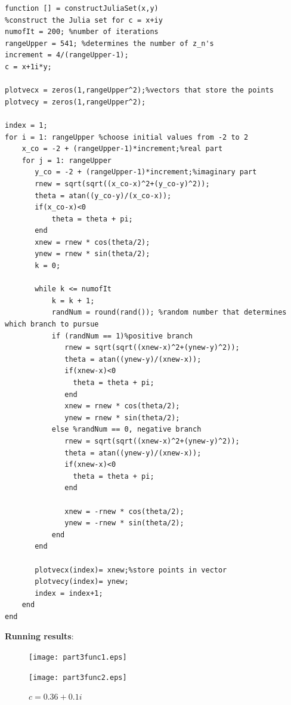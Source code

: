 \documentclass{article}
\begin{document}
\begin{lstlisting}
function [] = constructJuliaSet(x,y)
%construct the Julia set for c = x+iy
numofIt = 200; %number of iterations
rangeUpper = 541; %determines the number of z_n's
increment = 4/(rangeUpper-1);
c = x+1i*y;

plotvecx = zeros(1,rangeUpper^2);%vectors that store the points
plotvecy = zeros(1,rangeUpper^2);

index = 1;
for i = 1: rangeUpper %choose initial values from -2 to 2
    x_co = -2 + (rangeUpper-1)*increment;%real part
    for j = 1: rangeUpper 
       y_co = -2 + (rangeUpper-1)*increment;%imaginary part 
       rnew = sqrt(sqrt((x_co-x)^2+(y_co-y)^2));
       theta = atan((y_co-y)/(x_co-x));
       if(x_co-x)<0
           theta = theta + pi;
       end
       xnew = rnew * cos(theta/2);
       ynew = rnew * sin(theta/2);
       k = 0;

       while k <= numofIt
           k = k + 1;
           randNum = round(rand()); %random number that determines which branch to pursue
           if (randNum == 1)%positive branch
              rnew = sqrt(sqrt((xnew-x)^2+(ynew-y)^2));
              theta = atan((ynew-y)/(xnew-x));
              if(xnew-x)<0
                theta = theta + pi;
              end
              xnew = rnew * cos(theta/2);
              ynew = rnew * sin(theta/2);
           else %randNum == 0, negative branch
              rnew = sqrt(sqrt((xnew-x)^2+(ynew-y)^2));
              theta = atan((ynew-y)/(xnew-x));
              if(xnew-x)<0
                theta = theta + pi;
              end
              
              xnew = -rnew * cos(theta/2);
              ynew = -rnew * sin(theta/2);
           end
       end

       plotvecx(index)= xnew;%store points in vector
       plotvecy(index)= ynew;
       index = index+1;
    end
end

\end{lstlisting}


\textbf{Running results}: \\
\begin{figure}[H]
  \centering
  \begin{minipage}[b]{0.45\textwidth}
    \texttt{[image: part3func1.eps]}
    \caption{$c = 0$}
  \end{minipage}
  \hfill
  \begin{minipage}[b]{0.45\textwidth}
    \texttt{[image: part3func2.eps]}
    \caption{$c = 0.36 +  0.1i$}
  \end{minipage}
   \end{figure}
   
\end{document}

